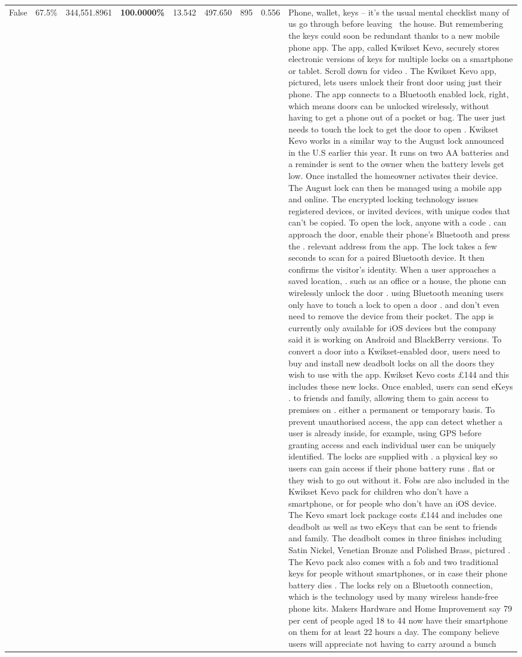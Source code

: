 \begin{table}[H]
\begin{tabular}{lllrlllll}
False & 67.5\% & 344,551.8961 & \bfseries \color{red} 100.0000\% & 13.542 & 497.650 & 895 & 0.556 & Phone, wallet, keys – it’s the usual mental checklist many of us go through before leaving  the house. But remembering the keys could soon be redundant thanks to a new mobile phone app. The app, called Kwikset Kevo, securely stores electronic versions of keys for multiple locks on a smartphone or tablet. Scroll down for video . The Kwikset Kevo app, pictured, lets users unlock their front door using just their phone. The app connects to a Bluetooth enabled lock, right, which means doors can be unlocked wirelessly, without having to get a phone out of a pocket or bag. The user just needs to touch the lock to get the door to open . Kwikset Kevo works in a similar way to the August lock announced in the U.S earlier this year. It runs on two AA batteries and a reminder is sent to the owner when the battery levels get low. Once installed the homeowner activates their device. The August lock can then be managed using a mobile app and online. The encrypted locking technology issues registered devices, or invited devices, with unique codes that can't be copied. To open the lock, anyone with a code . can approach the door, enable their phone's Bluetooth and press the . relevant address from the app. The lock takes a few seconds to scan for a paired Bluetooth device. It then confirms the visitor's identity. When a user approaches a saved location, . such as an office or a house, the phone can wirelessly unlock the door . using Bluetooth meaning users only have to touch a lock to open a door . and don't even need to remove the device from their pocket. The app is currently only available for iOS devices but the company said it is working on Android and BlackBerry versions. To convert a door into a Kwikset-enabled door, users need to buy and install new deadbolt locks on all the doors they wish to use with the app. Kwikset Kevo costs £144 and this includes these new locks. Once enabled, users can send eKeys . to friends and family, allowing them to gain access to premises on . either a permanent or temporary basis. To prevent unauthorised access, the app can detect whether a user is already inside, for example, using GPS before granting access and each individual user can be uniquely identified. The locks are supplied with . a physical key so users can gain access if their phone battery runs . flat or they wish to go out without it. Fobs are also included in the Kwikset Kevo pack for children who don't have a smartphone, or for people who don't have an iOS device. The Kevo smart lock package costs £144 and includes one deadbolt as well as two eKeys that can be sent to friends and family. The deadbolt comes in three finishes including Satin Nickel, Venetian Bronze and Polished Brass, pictured . The Kevo pack also comes with a fob and two traditional keys for people without smartphones, or in case their phone battery dies . The locks rely on a Bluetooth connection, which is the technology used by many wireless hands-free phone kits. Makers Hardware and Home Improvement say 79 per cent of people aged 18 to 44 now have their smartphone on them for at least 22 hours a day. The company believe users will appreciate not having to carry around a bunch 
\end{tabular}
\end{table}
